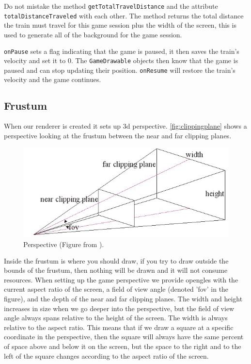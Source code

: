 \begin{description}
Do not mistake the method \lstinline|getTotalTravelDistance| and the attribute \lstinline|totalDistanceTraveled| with each other. The method returns the total distance the train must travel for this game session plus the width of the screen, this is used to generate all of the background for the game session.

\lstinline|onPause| sets a flag indicating that the game is paused, it then saves the train's velocity and set it to 0. The \lstinline|GameDrawable| objects then know that the game is paused and can stop updating their position. \lstinline|onResume| will restore the train's velocity and the game continues.

\end{description}
\subsection{Frustum}

When our renderer is created it sets up \ac{3d} perspective. \autoref{fig:clippingplane} shows a perspective looking at the frustum between the near and far clipping planes.
\begin{figure}[H]
\centering
\includegraphics[width=0.9\linewidth]{img/clippingplane.jpg}
\caption{Perspective (Figure from \citep{clippingplane}).}
\label{fig:clippingplane}
\end{figure}
Inside the frustum is where you should draw, if you try to draw outside the bounds of the frustum, then nothing will be drawn and it will not consume resources. When setting up the game perspective we provide \ac{opengles} with the current aspect ratio of the screen, a field of view angle (denoted 'fov' in the figure), and the depth of the near and far clipping planes. The width and height increases in size when we go deeper into the perspective, but the field of view angle always spans relative to the height of the screen. The width is always relative to the aspect ratio. This means that if we draw a square at a specific coordinate in the perspective, then the square will always have the same percent of space above and below it on the screen, but the space to the right and to the left of the square changes according to the aspect ratio of the screen.

